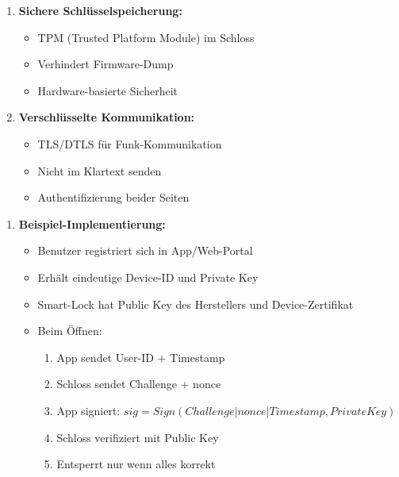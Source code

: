 \documentclass[12pt,a4paper]{article}
\begin{document}
\begin{tcolorbox}[colback=solutionbg, colframe=black!30]
\begin{enumerate}[1.]
    \item \textbf{Sichere Schlüsselspeicherung:}
    \begin{itemize}
        \item TPM (Trusted Platform Module) im Schloss
        \item Verhindert Firmware-Dump
        \item Hardware-basierte Sicherheit
    \end{itemize}
    
    \item \textbf{Verschlüsselte Kommunikation:}
    \begin{itemize}
        \item TLS/DTLS für Funk-Kommunikation
        \item Nicht im Klartext senden
        \item Authentifizierung beider Seiten
    \end{itemize}
\end{enumerate}
    
\end{tcolorbox}
\begin{tcolorbox}[colback=solutionbg, colframe=black!30]
    
\begin{enumerate}[7.]
    \item \textbf{Beispiel-Implementierung:}
    \begin{itemize}
        \item Benutzer registriert sich in App/Web-Portal
        \item Erhält eindeutige Device-ID und Private Key
        \item Smart-Lock hat Public Key des Herstellers und Device-Zertifikat
        \item Beim Öffnen:
        \begin{enumerate}[(1)]
            \item App sendet User-ID + Timestamp
            \item Schloss sendet Challenge + nonce
            \item App signiert: $sig = Sign(Challenge | nonce | Timestamp, PrivateKey)$
            \item Schloss verifiziert mit Public Key
            \item Entsperrt nur wenn alles korrekt
        \end{enumerate}
    \end{itemize}
\end{enumerate}

\end{tcolorbox}
\end{document}
